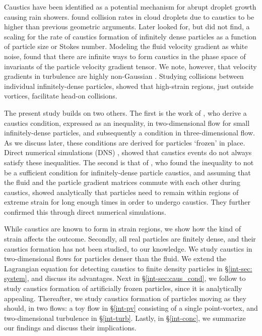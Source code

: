 \documentclass[../Rajarshi-thesis-draft.tex]{subfiles}
\begin{document}
 Caustics have been identified \cite{falkovich2002,shaw2003,wilkinson2006} as a potential mechanism for abrupt droplet growth causing rain showers. \citet{falkovich2007} found collision rates in cloud droplets due to caustics to be higher than previous geometric arguments. Later \citet{bhatnagar2022} looked for, but did not find, a scaling for the rate of caustics formation of infinitely dense particles as a function of particle size or Stokes number. Modeling the fluid velocity gradient as white noise, \citet{barta2022} found that there are infinite ways to form caustics in the phase space of invariants of the particle velocity gradient tensor. We note, however, that velocity gradients in turbulence are highly non-Gaussian \cite{meneveau2011}. Studying collisions between individual infinitely-dense particles, \citet{picardo2019} showed that high-strain regions, just outside vortices, facilitate head-on collisions.

The present study builds on two others. The first is the work of \citet{meibohm2021}, who derive a caustics condition, expressed as an inequality, in two-dimensional flow for small infinitely-dense particles, and subsequently \cite{meibohm2023} a condition in three-dimensional flow. As we discuss later, these conditions are derived for particles `frozen' in place. Direct numerical simulations (DNS) \cite{meibohm2024}, showed that caustics events do not always satisfy these inequalities. The second is that of \citet{batge2023}, who found the inequality to not be a sufficient condition for infinitely-dense particle caustics, and assuming that the fluid and the particle gradient matrices commute with each other during caustics, showed analytically that particles need to remain within regions of extreme strain for long enough times in order to undergo caustics. They further confirmed this through direct numerical simulations.

While caustics are known to form in strain regions, we show how {the kind of strain} affects the outcome. Secondly, all real particles are finitely dense, and their caustics formation has not been studied, to our knowledge. We {study caustics } in two-dimensional flows for particles denser than the fluid. We extend the Lagrangian equation for detecting caustics to finite density particles in \S \ref{int-sec: system}, and discuss its advantages. Next in \S \ref{int-sec:caus_cond}, we follow \cite{meibohm2021,meibohm2023} to study caustics formation of artificially frozen particles, since it is analytically appealing. Thereafter, we study caustics formation of particles moving as they should, in two flows: a toy flow in \S \ref{int-pv} consisting of a single point-vortex, and two-dimensional turbulence in \S \ref{int-turb}. Lastly, in \S \ref{int-conc}, we summarize our findings and discuss their implications.
\end{document}
